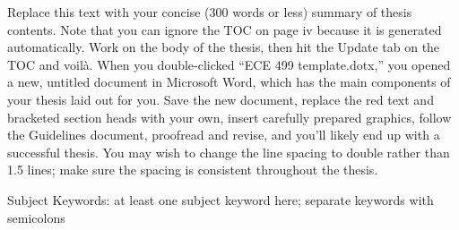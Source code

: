 Replace this text with your concise (300 words or less) summary of thesis contents. 
Note that you can ignore the TOC on page iv because it is generated automatically. Work on the body of the thesis, then hit the Update tab on the TOC and voilà.
When you double-clicked “ECE 499 template.dotx,” you opened a new, untitled document in Microsoft Word, which has the main components of your thesis laid out for you. Save the new document, replace the red text and bracketed section heads with your own, insert carefully prepared graphics, follow the Guidelines document, proofread and revise, and you’ll likely end up with a successful thesis. You may wish to change the line spacing to double rather than 1.5 lines; make sure the spacing is consistent throughout the thesis.

Subject Keywords: at least one subject keyword here; separate keywords with semicolons 
